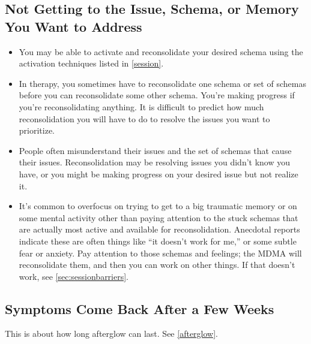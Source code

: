 \documentclass[11pt,oneside]{book}
\begin{document}
\subsection{Not Getting to the Issue, Schema, or Memory You Want to Address}
\begin{itemize}
    \item You may be able to activate and reconsolidate your desired schema using the activation techniques listed in \cref{session}.
    \item In therapy, you sometimes have to reconsolidate one schema or set of schemas before you can reconsolidate some other schema. You're making progress if you're reconsolidating anything. It is difficult to predict how much reconsolidation you will have to do to resolve the issues you want to prioritize.
    \item People often misunderstand their issues and the set of schemas that cause their issues. Reconsolidation may be resolving issues you didn't know you have, or you might be making progress on your desired issue but not realize it.
    \item It's common to overfocus on trying to get to a big traumatic memory or on some mental activity other than paying attention to the stuck schemas that are actually most active and available for reconsolidation. Anecdotal reports indicate these are often things like \enquote{it doesn't work for me,} or some subtle fear or anxiety. Pay attention to those schemas and feelings; the MDMA will reconsolidate them, and then you can work on other things. If that doesn't work, see \cref{sec:sessionbarriers}.
\end{itemize}

\subsection{Symptoms Come Back After a Few Weeks}
This is about how long afterglow can last. See \cref{afterglow}.
\end{document}
